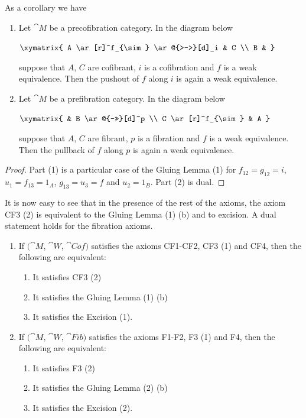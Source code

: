 As a corollary we have

\begin{lem}[Excision]
\label{lem:excision}
\mbox{}
\begin{enumerate}
\item
Let ${\cat M}$ be a precofibration category. In the diagram below
\begin{center}
$ \xymatrix {
        A \ar[r]^f_{\sim} \ar@{>->}[d]_i & C \\
	B & 
	}$
\end{center}
suppose that $A$, $C$ are cofibrant, $i$ is a cofibration and $f$ is a weak equivalence. Then the pushout of $f$ along $i$ is again a weak equivalence.
\item
Let ${\cat M}$ be a prefibration category. In the diagram below
\begin{center}
$ \xymatrix {
        & B \ar@{->>}[d]^p \\
        C \ar[r]^f_{\sim} & A
	}$
\end{center}
suppose that $A$, $C$ are fibrant, $p$ is a fibration and $f$ is a weak equivalence. Then the pullback of $f$ along $p$ is again a weak equivalence.
\end{enumerate}
\end{lem}

\begin{proof}
Part (1) is a particular case of the Gluing Lemma (1) for $f_{12} = g_{12} = i$, $u_1 = f_{13} = 1_A$, $g_{13} = u_3 = f$ and $u_2 = 1_B$. Part (2) is dual.
\end{proof}

It is now easy to see that in the presence of the rest of the axioms, the axiom CF3 (2) is equivalent to the Gluing Lemma (1) (b) and to excision. A dual statement holds for the fibration axioms.

\begin{lem}
\label{lem:equivaxiomcf3}
\mbox{}
\begin{enumerate}
\item
If $({\cat M}$, ${\cat W}$, ${\cat Cof})$ satisfies the axioms CF1-CF2, CF3 (1) and CF4, then the following are equivalent:
\begin{enumerate}
\item
It satisfies CF3 (2)
\item
It satisfies the Gluing Lemma (1) (b)
\item
It satisfies the Excision  (1).
\end{enumerate}
\item
If $({\cat M}$, ${\cat W}$, ${\cat Fib})$ satisfies the axioms F1-F2, F3 (1) and F4, then the following are equivalent:
\begin{enumerate}
\item
It satisfies F3 (2)
\item
It satisfies the Gluing Lemma (2) (b)
\item
It satisfies the Excision  (2).
\end{enumerate}
\end{enumerate}
\end{lem}


